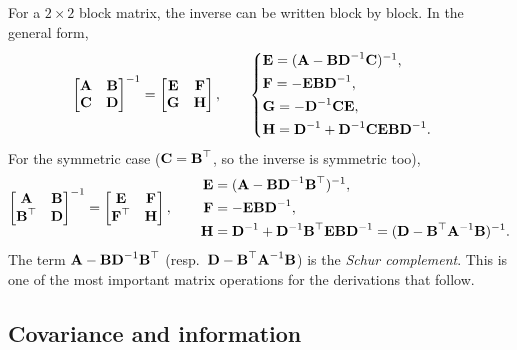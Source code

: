 For a $2\times2$ block matrix, the inverse can be written block by block. In the general form,
\begin{align}
\begin{bmatrix} \vect{A} & \vect{B} \\ \vect{C} & \vect{D} \end{bmatrix}^{-1}
= \begin{bmatrix} \vect{E} & \vect{F} \\ \vect{G} & \vect{H} \end{bmatrix}, \qquad
\begin{cases}
\vect{E} = (\vect{A} - \vect{B}\vect{D}^{-1}\vect{C})^{-1}, \\[2pt]
\vect{F} = -\vect{E}\vect{B}\vect{D}^{-1}, \\[2pt]
\vect{G} = -\vect{D}^{-1}\vect{C}\vect{E}, \\[2pt]
\vect{H} = \vect{D}^{-1} + \vect{D}^{-1}\vect{C}\vect{E}\vect{B}\vect{D}^{-1}.
\end{cases}
\end{align}
For the symmetric case ($\vect{C}=\vect{B}\trans$, so the inverse is symmetric too),
\begin{align}
\begin{bmatrix} \vect{A} & \vect{B} \\ \vect{B}\trans & \vect{D} \end{bmatrix}^{-1}
= \begin{bmatrix} \vect{E} & \vect{F} \\ \vect{F}\trans & \vect{H} \end{bmatrix}, \qquad
\begin{aligned}
\vect{E} &= (\vect{A} - \vect{B}\vect{D}^{-1}\vect{B}\trans)^{-1}, \\
\vect{F} &= -\vect{E}\vect{B}\vect{D}^{-1}, \\
\vect{H} &= \vect{D}^{-1} + \vect{D}^{-1}\vect{B}\trans\vect{E}\vect{B}\vect{D}^{-1} = (\vect{D} - \vect{B}\trans\vect{A}^{-1}\vect{B})^{-1}.
\end{aligned}
\end{align}
The term $\vect{A} - \vect{B}\vect{D}^{-1}\vect{B}\trans$ (resp.\ $\vect{D} - \vect{B}\trans\vect{A}^{-1}\vect{B}$) is the \emph{Schur complement}. This is one of the most important matrix operations for the derivations that follow.

\subsection{Covariance and information}

